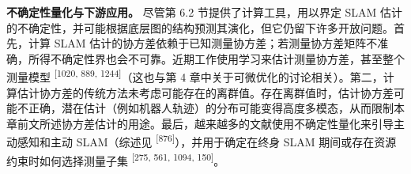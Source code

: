 \textbf{不确定性量化与下游应用。} 尽管第 6.2 节提供了计算工具，用以界定 SLAM 估计的不确定性，并可能根据底层图的结构预测其演化，但它仍留下许多开放问题。首先，计算 SLAM 估计的协方差依赖于已知测量协方差；若测量协方差矩阵不准确，所得不确定性界也会不可靠。近期工作使用学习来估计测量协方差，甚至整个测量模型 \textsuperscript{[1020, 889, 1244]}（这也与第 4 章中关于可微优化的讨论相关）。第二，计算估计协方差的传统方法未考虑可能存在的离群值。存在离群值时，估计协方差可能不正确，潜在估计（例如机器人轨迹）的分布可能变得高度多模态，从而限制本章前文所述协方差估计的用途。最后，越来越多的文献使用不确定性量化来引导主动感知和主动 SLAM（综述见 \textsuperscript{[876]}），并用于确定在终身 SLAM 期间或存在资源约束时如何选择测量子集 \textsuperscript{[275, 561, 1094, 150]}。
